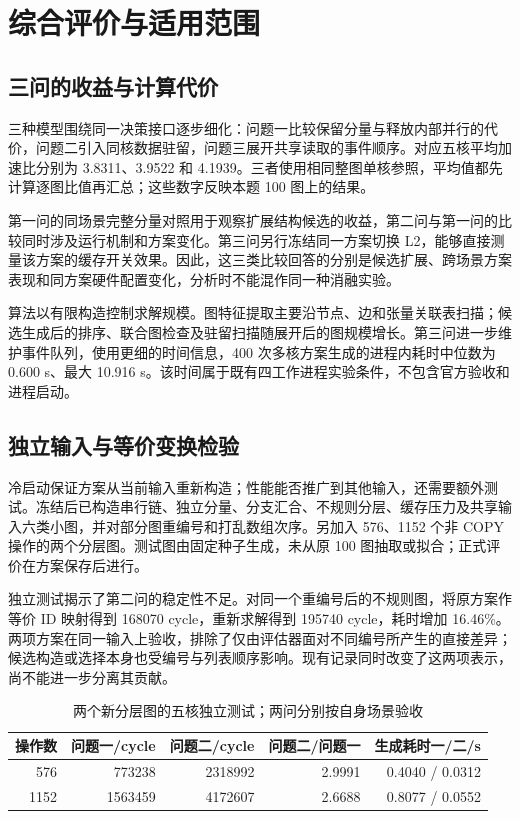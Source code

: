 \section{综合评价与适用范围}

\subsection{三问的收益与计算代价}
三种模型围绕同一决策接口逐步细化：问题一比较保留分量与释放内部并行的代价，问题二引入同核数据驻留，问题三展开共享读取的事件顺序。对应五核平均加速比分别为 3.8311、3.9522 和 4.1939。三者使用相同整图单核参照，平均值都先计算逐图比值再汇总；这些数字反映本题 100 图上的结果。

第一问的同场景完整分量对照用于观察扩展结构候选的收益，第二问与第一问的比较同时涉及运行机制和方案变化。第三问另行冻结同一方案切换 L2，能够直接测量该方案的缓存开关效果。因此，这三类比较回答的分别是候选扩展、跨场景方案表现和同方案硬件配置变化，分析时不能混作同一种消融实验。

算法以有限构造控制求解规模。图特征提取主要沿节点、边和张量关联表扫描；候选生成后的排序、联合图检查及驻留扫描随展开后的图规模增长。第三问进一步维护事件队列，使用更细的时间信息，400 次多核方案生成的进程内耗时中位数为 0.600 s、最大 10.916 s。该时间属于既有四工作进程实验条件，不包含官方验收和进程启动。

\subsection{独立输入与等价变换检验}
冷启动保证方案从当前输入重新构造；性能能否推广到其他输入，还需要额外测试。冻结后已构造串行链、独立分量、分支汇合、不规则分层、缓存压力及共享输入六类小图，并对部分图重编号和打乱数组次序。另加入 576、1152 个非 COPY 操作的两个分层图。测试图由固定种子生成，未从原 100 图抽取或拟合；正式评价在方案保存后进行。

独立测试揭示了第二问的稳定性不足。对同一个重编号后的不规则图，将原方案作等价 ID 映射得到 168070 cycle，重新求解得到 195740 cycle，耗时增加 16.46\%。两项方案在同一输入上验收，排除了仅由评估器面对不同编号所产生的直接差异；候选构造或选择本身也受编号与列表顺序影响。现有记录同时改变了这两项表示，尚不能进一步分离其贡献。

\begin{table}[htbp]
\centering
\caption{两个新分层图的五核独立测试；两问分别按自身场景验收}
\label{tab:newgraphs}
\begin{tabular}{rrrrr}
\hline
操作数 & 问题一/cycle & 问题二/cycle & 问题二/问题一 & 生成耗时一/二/s \\
\hline
576 & 773238 & 2318992 & 2.9991 & 0.4040 / 0.0312 \\
1152 & 1563459 & 4172607 & 2.6688 & 0.8077 / 0.0552 \\
\hline
\end{tabular}
\end{table}

